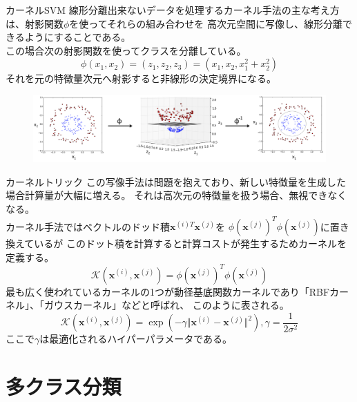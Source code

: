 \documentclass[aspectratio=169, dvipdfmx, 11pt]{beamer} %
\begin{document}
\begin{frame}{カーネルSVM}
    線形分離出来ないデータを処理するカーネル手法の主な考え方は、射影関数\(\phi\)を使ってそれらの組み合わせを
    高次元空間に写像し、線形分離できるようにすることである。\\
    この場合次の射影関数を使ってクラスを分離している。
    \begin{equation*}
        \phi(x_1, x_2) = (z_1, z_2, z_3) = (x_1, x_2, x_{1}^{2}+x_{2}^{2})
    \end{equation*}
    それを元の特徴量次元へ射影すると非線形の決定境界になる。
    \begin{figure}[b]
        \begin{center}
        \includegraphics[width=150mm]{img/day02/fig08.png}
        \end{center}
    \end{figure}
\end{frame}

\begin{frame}{カーネルトリック}
    この写像手法は問題を抱えており、新しい特徴量を生成した場合計算量が大幅に増える。
    それは高次元の特徴量を扱う場合、無視できなくなる。\\
    カーネル手法ではベクトルのドッド積\(\bm{x}^{(i)T}\bm{x}^{(j)}\)を
    \(\phi(\bm{x}^{(j)})^T \phi(\bm{x}^{(j)})\)に置き換えているが
    このドット積を計算すると計算コストが発生するためカーネルを定義する。
    \begin{equation*}
        \mathcal{K} (\bm{x}^{(i)}, \bm{x}^{(j)}) = \phi(\bm{x}^{(j)})^T \phi(\bm{x}^{(j)})
    \end{equation*}
    最も広く使われているカーネルの1つが動径基底関数カーネルであり「RBFカーネル」、「ガウスカーネル」などと呼ばれ、
    このように表される。
    \begin{equation*}
        \mathcal{K} (\bm{x}^{(i)}, \bm{x}^{(j)}) 
        = \exp (-\gamma \Vert\bm{x}^{(i)} - \bm{x}^{(j)}\Vert^2), 
        \gamma = \frac{1}{2\sigma ^2}
    \end{equation*}
    ここで\(\gamma \)は最適化されるハイパーパラメータである。
\end{frame}

\section{多クラス分類}
\end{document}
